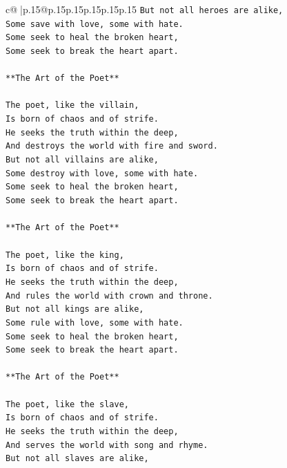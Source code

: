 \documentclass{article}
\begin{document}
{\begin{supertabular}{c@{$\;$}|p{.15\linewidth}@{}p{.15\linewidth}p{.15\linewidth}p{.15\linewidth}p{.15\linewidth}p{.15\linewidth}}
{{{\texttt{But not all heroes are alike,} \\
\texttt{Some save with love, some with hate.} \\
\texttt{Some seek to heal the broken heart,} \\
\texttt{Some seek to break the heart apart.} \\
\\ 
\texttt{**The Art of the Poet**} \\
\\ 
\texttt{The poet, like the villain,} \\
\texttt{Is born of chaos and of strife.} \\
\texttt{He seeks the truth within the deep,} \\
\texttt{And destroys the world with fire and sword.} \\
\texttt{But not all villains are alike,} \\
\texttt{Some destroy with love, some with hate.} \\
\texttt{Some seek to heal the broken heart,} \\
\texttt{Some seek to break the heart apart.} \\
\\ 
\texttt{**The Art of the Poet**} \\
\\ 
\texttt{The poet, like the king,} \\
\texttt{Is born of chaos and of strife.} \\
\texttt{He seeks the truth within the deep,} \\
\texttt{And rules the world with crown and throne.} \\
\texttt{But not all kings are alike,} \\
\texttt{Some rule with love, some with hate.} \\
\texttt{Some seek to heal the broken heart,} \\
\texttt{Some seek to break the heart apart.} \\
\\ 
\texttt{**The Art of the Poet**} \\
\\ 
\texttt{The poet, like the slave,} \\
\texttt{Is born of chaos and of strife.} \\
\texttt{He seeks the truth within the deep,} \\
\texttt{And serves the world with song and rhyme.} \\
\texttt{But not all slaves are alike,} \\
}}}
\end{supertabular}}
\end{document}
